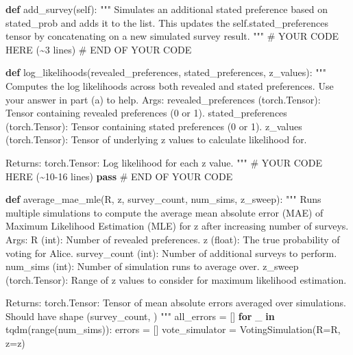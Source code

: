 \documentclass[
  letterpaper,
  numbers=noenddot,
  DIV=11]{scrreprt}
\newenvironment{Shaded}{\begin{snugshade}}{\end{snugshade}}
\newcommand{\BuiltInTok}[1]{\textcolor[rgb]{0.00,0.23,0.31}{#1}}
\newcommand{\CommentTok}[1]{\textcolor[rgb]{0.37,0.37,0.37}{#1}}
\newcommand{\ControlFlowTok}[1]{\textcolor[rgb]{0.00,0.23,0.31}{\textbf{#1}}}
\newcommand{\KeywordTok}[1]{\textcolor[rgb]{0.00,0.23,0.31}{\textbf{#1}}}
\newcommand{\NormalTok}[1]{\textcolor[rgb]{0.00,0.23,0.31}{#1}}
\newcommand{\OperatorTok}[1]{\textcolor[rgb]{0.37,0.37,0.37}{#1}}
\newcommand{\RegionMarkerTok}[1]{\textcolor[rgb]{0.00,0.23,0.31}{#1}}
\newcommand{\VariableTok}[1]{\textcolor[rgb]{0.07,0.07,0.07}{#1}}
\theoremstyle{definition}
\theoremstyle{plain}
\theoremstyle{plain}
\theoremstyle{remark}
\begin{document}
\begin{tcolorbox}[colframe=.grey, title=\faCode \enspace Code]
\begin{Shaded}
\begin{Highlighting}[numbers=left,,]
    \KeywordTok{def}\NormalTok{ add\_survey(}\VariableTok{self}\NormalTok{):}
        \CommentTok{"""}
\CommentTok{        Simulates an additional stated preference based on stated\_prob and adds it to the list.}
\CommentTok{        This updates the self.stated\_preferences tensor by concatenating on a new simulated survey result.}
\CommentTok{        """}
        \CommentTok{\# YOUR CODE HERE (\textasciitilde{}3 lines)}
        \CommentTok{\# }\RegionMarkerTok{END}\CommentTok{ OF YOUR CODE}

\KeywordTok{def}\NormalTok{ log\_likelihoods(revealed\_preferences, stated\_preferences, z\_values):}
    \CommentTok{"""}
\CommentTok{    Computes the log likelihoods across both revealed and stated preferences.}
\CommentTok{    Use your answer in part (a) to help.}
\CommentTok{    }
\CommentTok{    Args:}
\CommentTok{        revealed\_preferences (torch.Tensor): Tensor containing revealed preferences (0 or 1).}
\CommentTok{        stated\_preferences (torch.Tensor): Tensor containing stated preferences (0 or 1).}
\CommentTok{        z\_values (torch.Tensor): Tensor of underlying z values to calculate likelihood for.}

\CommentTok{    Returns:}
\CommentTok{        torch.Tensor: Log likelihood for each z value.}
\CommentTok{    """}
    \CommentTok{\# YOUR CODE HERE (\textasciitilde{}10{-}16 lines)}
    \ControlFlowTok{pass}
    \CommentTok{\# }\RegionMarkerTok{END}\CommentTok{ OF YOUR CODE }

\KeywordTok{def}\NormalTok{ average\_mae\_mle(R, z, survey\_count, num\_sims, z\_sweep):}
    \CommentTok{"""}
\CommentTok{    Runs multiple simulations to compute the average mean absolute error (MAE) of Maximum Likelihood Estimation (MLE) }
\CommentTok{    for z after increasing number of surveys.}
\CommentTok{    }
\CommentTok{    Args:}
\CommentTok{        R (int): Number of revealed preferences.}
\CommentTok{        z (float): The true probability of voting for Alice.}
\CommentTok{        survey\_count (int): Number of additional surveys to perform.}
\CommentTok{        num\_sims (int): Number of simulation runs to average over.}
\CommentTok{        z\_sweep (torch.Tensor): Range of z values to consider for maximum likelihood estimation.}

\CommentTok{    Returns:}
\CommentTok{        torch.Tensor: Tensor of mean absolute errors averaged over simulations.}
\CommentTok{                      Should have shape (survey\_count, )}
\CommentTok{    """}
\NormalTok{    all\_errors }\OperatorTok{=}\NormalTok{ []}
    \ControlFlowTok{for}\NormalTok{ \_ }\KeywordTok{in}\NormalTok{ tqdm(}\BuiltInTok{range}\NormalTok{(num\_sims)):}
\NormalTok{        errors }\OperatorTok{=}\NormalTok{ []}
\NormalTok{        vote\_simulator }\OperatorTok{=}\NormalTok{ VotingSimulation(R}\OperatorTok{=}\NormalTok{R, z}\OperatorTok{=}\NormalTok{z)}


\end{Highlighting}
\end{Shaded}
\end{tcolorbox}
\end{document}
